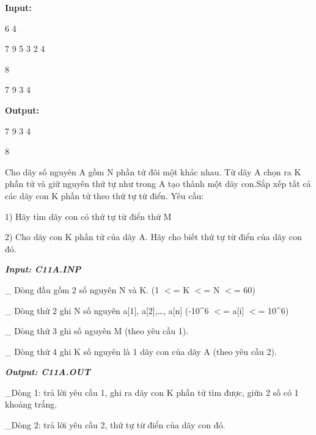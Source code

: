 \textbf{    Input:   }

   6 4  

   7 9 5 3 2 4  

   8  

   7 9 3 4  



\textbf{    Output:   }



   7 9 3 4  

   8  



    Cho dãy số nguyên A gồm N phần tử đôi một khác nhau. Từ dãy A chọn ra K phần tử và giữ nguyên thứ tự như trong A tạo thành một dãy con.Sắp xếp tất cả các dãy con K phần tử theo thứ tự từ điển. Yêu cầu:   

    1) Hãy tìm dãy con có thứ tự từ điển thứ M   

    2) Cho dãy con K phần tử của dãy A. Hãy cho biết thứ tự từ điển của dãy con đó.   

\textbf{\emph{      Input: C11A.INP     }}

    \_ Dòng đầu gồm 2 số nguyên N và K. (1 $<$= K $<$= N $<$= 60)   

    \_ Dòng thứ 2 ghi N số nguyên a[1], a[2],…, a[n] (-10\textasciicircum6 $<$= a[i] $<$= 10\textasciicircum6)   

    \_ Dòng thứ 3 ghi số nguyên M (theo yêu cầu 1).   

    \_ Dòng thứ 4 ghi K số nguyên là 1 dãy con của dãy A (theo yêu cầu 2).   

\textbf{\emph{      Output: C11A.OUT     }}

    \_Dòng 1: trả lời yêu cầu 1, ghi ra dãy con K phần tử tìm được, giữa 2 số có 1 khoảng trắng.   

    \_Dòng 2: trả lời yêu cầu 2, thứ tự từ điển của dãy con đó.   
